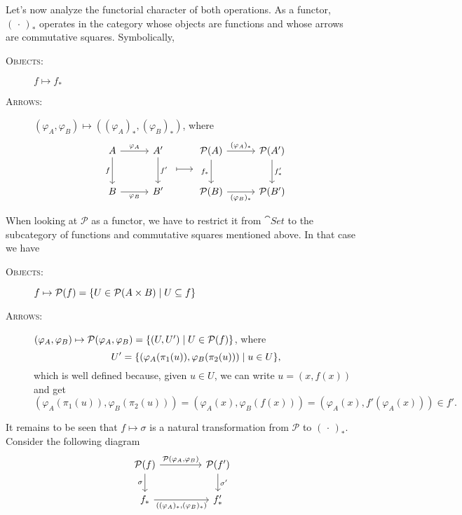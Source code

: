 Let's now analyze the functorial character of both operations. As a functor, $(\,\cdot\,)_*$ operates in the category whose objects are functions and whose arrows are commutative squares. Symbolically,
\begin{description}
    \item[\rm\textsc{Objects:}] $f\mapsto f_*$
    \item[\rm\textsc{Arrows:}] $(\varphi_A,\varphi_B)\mapsto((\varphi_A)_*,(\varphi_B)_*)$, where
    $$
        \begin{tikzcd}[row sep=0.3cm, column sep={0.4cm,0.6cm}]
            A
                    \arrow[dd,"f"']
                    \arrow[r,"\varphi_A"]
                &A'
                    \arrow[dd,"f'"]
                &\mathcal P(A)
                    \arrow[r,"(\varphi_A)_*"]
                    \arrow[dd,"f_*"']
                &\mathcal P(A')
                    \arrow[dd,"f'_*"]\\
                &{}
                    \arrow[r,mapsto,shorten >= 0.5cm, shorten <= 0.5cm]
                &{}\\
            B
                    \arrow[r,"\varphi_B"']
                &B'
                &\mathcal P(B)
                    \arrow[r,"(\varphi_B)_*"']
                &\mathcal P(B')
        \end{tikzcd}
    $$
\end{description}
When looking at $\mathcal P$ as a functor, we have to restrict it from $\cat{Set}$ to the subcategory of functions and commutative squares mentioned above. In that case we have
\begin{description}
    \item[\rm\textsc{Objects:}] $f\mapsto\mathcal P(f)=\{U\in\mathcal P(A\times B)\mid U\subseteq f\}$
    \item[\rm\textsc{Arrows:}] $(\varphi_A,\varphi_B)\mapsto\mathcal P(\varphi_A,\varphi_B)
    = \{(U,U')\mid U\in\mathcal P(f)\}$, where
    $$
        U' = \{(\varphi_A(\pi_1(u)),\varphi_B(\pi_2(u)))\mid u\in U\},
    $$
    which is well defined because, given $u\in U$, we can write $u=(x,f(x))$ and get
    $$
        (\varphi_A(\pi_1(u)),\varphi_B(\pi_2(u)))
        = (\varphi_A(x),\varphi_B(f(x)))
        = (\varphi_A(x),f'(\varphi_A(x)))\in f'.
    $$
\end{description}
It remains to be seen that $f\mapsto\sigma$ is a natural transformation from $\mathcal P$ to $(\,\cdot\,)_*$. Consider the following diagram
$$
    \begin{tikzcd}[column sep={1.5cm}]
        \mathcal P(f)
                \arrow[r,"{\mathcal P(\varphi_A,\varphi_B)}"]
                \arrow[d,"\sigma"']
            &\mathcal P(f')
                \arrow[d,"\sigma'"]\\
        f_*
                \arrow[r,"{((\varphi_A)_*,(\varphi_B)_*)}"']
            &f'_*
    \end{tikzcd}
$$
